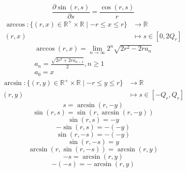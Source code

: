 \documentclass[a4paper,12pt]{report}
\begin{document}
\begin{equation}
\frac{\partial \sin(r,s)}{\partial s} = \frac{\cos(r,s)}{r}
\end{equation}
\begin{equation}
\begin{aligned}
\arccos \colon \{(r,x) \in \mathbb{R}^{+} \times \mathbb{R} \mid -r \leq x \leq r\} & \to \mathbb{R} \\
(r,x) & \mapsto s \in \left[0, 2Q_r\right]
\end{aligned}
\end{equation}
\begin{subequations}
\begin{gather}
\arccos(r,x) = \lim \limits_{n \to \infty} 2^n \sqrt{2r^2 - 2ra_n} \\
a_n = \frac{\sqrt{2r^2 + 2ra_{n-1}}}{2}, n \geq 1 \\
a_0 = x
\end{gather}
\end{subequations}
\begin{equation}
\begin{aligned}
\arcsin \colon \{(r,y) \in \mathbb{R}^{+} \times \mathbb{R} \mid -r \leq y \leq r\} & \to \mathbb{R} \\
(r,y) & \mapsto s \in \left[-Q_r, Q_r\right]
\end{aligned}
\end{equation}
\begin{equation}
s = \arcsin(r,-y)
\end{equation}
\begin{equation}
\sin(r,s) = \sin(r,\arcsin(r,-y))
\end{equation}
\begin{equation}
\sin(r,s) = -y
\end{equation}
\begin{equation}
-\sin(r,s) = -(-y)
\end{equation}
\begin{equation}
\sin(r,-s) = -(-y)
\end{equation}
\begin{equation}
\sin(r,-s) = y
\end{equation}
\begin{equation}
\arcsin(r,\sin(r,-s)) = \arcsin(r,y)
\end{equation}
\begin{equation}
-s = \arcsin(r,y)
\end{equation}
\begin{equation}
-(-s) = -\arcsin(r,y)
\end{equation}
\end{document}

